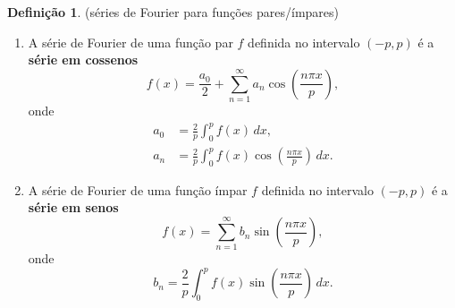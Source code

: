 \documentclass[12pt]{article}
\theoremstyle{plain}
\theoremstyle{definition}
\newtheorem{defn}{Definição}[section]
\theoremstyle{remark}
\begin{document}
\begin{defn} (séries de Fourier para funções pares/ímpares)
    \begin{enumerate}
        \item[(i)] A série de Fourier de uma função par \(f\) definida no intervalo \((-p,p)\) é a \textbf{série em cossenos}
        \begin{equation}
            f(x) = \frac{a_0}{2} + \sum_{n=1}^{\infty} a_n \cos\left(\frac{n\pi x}{p}\right),
        \end{equation}
        \noindent onde 
        \begin{align}
            a_0 &= \frac{2}{p} \int_{0}^{p} f(x) \, dx, \\
            a_n &= \frac{2}{p} \int_{0}^{p} f(x) \cos\left(\frac{n\pi x}{p}\right) \, dx.
        \end{align}
        \item[(ii)] A série de Fourier de uma função ímpar \(f\) definida no intervalo \((-p,p)\) é a \textbf{série em senos}
        \begin{equation}
            f(x) = \sum_{n=1}^{\infty} b_n \sin\left(\frac{n\pi x}{p}\right),
        \end{equation}
        \noindent onde
        \begin{equation}
            b_n = \frac{2}{p} \int_{0}^{p} f(x) \sin\left(\frac{n\pi x}{p}\right) \, dx.
        \end{equation}
    \end{enumerate}
\end{defn}
\end{document}
